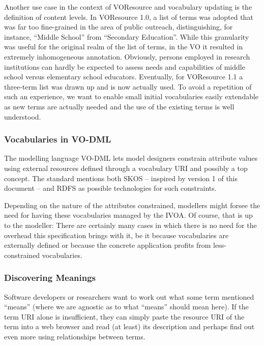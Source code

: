 \documentclass[11pt,a4paper]{ivoa}
\begin{document}
Another use case in the context of VOResource and vocabulary updating
is the definition of content levels.  In VOResource 1.0, a list of
terms was adopted that was far too fine-grained in the area of public
outreach, distinguishing, for instance, ``Middle School'' from
``Secondary Education''. While this granularity was useful for the
original realm of the list of terms, in the VO it resulted in extremely
inhomogeneous annotation.  Obviously, persons employed in research
institutions can hardly be expected to assess needs and capabilities of
middle school versus elementary school educators.  Eventually, for
VOResource 1.1 a three-term list was drawn up and is now actually used.
To avoid a repetition of such an experience, we want to enable small
initial vocabularies easily extendable as new terms are actually needed
and the use of the existing terms is well understood.


\subsubsection{Vocabularies in VO-DML}

The modelling language VO-DML \citep{2018ivoa.spec.0910L} lets model
designers constrain attribute values using external resources defined
through a vocabulary URI and possibly a top concept.  The standard
mentions both SKOS -- inspired by version 1 of this document -- and RDFS
as possible technologies for such constraints.

Depending on the nature of the attributes constrained, modellers might
forsee the need for having these vocabularies managed by the IVOA.  Of
course, that is up to the modeller: There are certainly many cases in
which there is no need for the overhead this specification brings with
it, be it because vocabularies are externally defined or because the
concrete application profits from less-constrained vocabularies.

\subsubsection{Discovering Meanings}
\label{uc:discovering}

Software developers or researchers want to work out
what some term mentioned ``means'' (where we are agnostic as to what
``means'' should mean here).  If the term URI alone is insufficient,
they can simply paste the resource URI of the term into a web browser
and read (at least) its description and perhaps find out even more using
relationships between terms.
\end{document}
